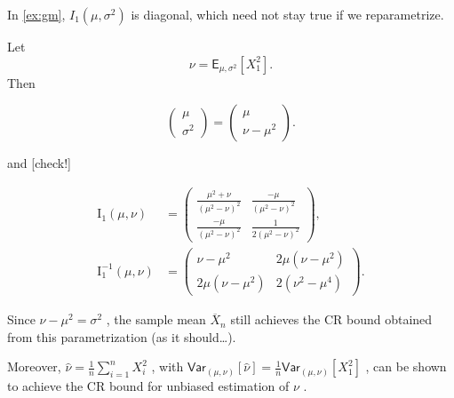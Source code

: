 \begin{ex}
    
In \autoref{ex:gm}, \(I_1(\mu, \sigma^2)\) is diagonal, which need not stay
true if we reparametrize.

Let \[\nu = \mathsf{E}_{\mu,\sigma^2}[X_1^2].\]  
Then

\[\begin{pmatrix} \mu \\ \sigma^2 \end{pmatrix} = \begin{pmatrix} \mu \\ \nu - \mu^2 \end{pmatrix}.\]

and {[}check!{]}

\[\begin{split} \mathrm{I}_{1}(\mu,\nu) &= \begin{pmatrix} \frac{\mu^{2}+\nu}{(\mu^{2}-\nu)^{2}} & \frac{-\mu}{(\mu^{2}-\nu)^{2}} \\ \frac{-\mu}{(\mu^{2}-\nu)^{2}} & \frac{1}{2(\mu^{2}-\nu)^{2}} \end{pmatrix}, \\ \mathrm{I}_{1}^{-1}(\mu,\nu) &= \begin{pmatrix} \nu-\mu^{2} & 2\mu(\nu-\mu^{2}) \\ 2\mu(\nu-\mu^{2}) & 2(\nu^{2}-\mu^{4}) \end{pmatrix}. \end{split}\]

Since \(\nu - \mu^2 = \sigma^2\) , the sample mean \(\overline{X}_n\)
still achieves the CR bound obtained from this parametrization (as it
should\ldots).

Moreover, \(\hat{\nu} = \frac{1}{n} \sum_{i=1}^{n} X_i^2\) , with
\(\mathsf{Var}_{(\mu,\nu)}[\hat{\nu}] = \frac{1}{n} \mathsf{Var}_{(\mu,\nu)}[X_1^2]\)
, can be shown to achieve the CR bound for unbiased estimation of
\(\nu\) .
\end{ex}

